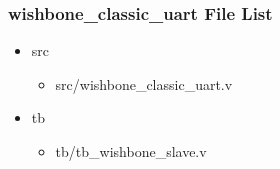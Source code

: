 \subsubsection{wishbone\_classic\_uart File List}
\begin{itemize}
\item src
	\begin{itemize}
	\item src/wishbone\_classic\_uart.v
	\end{itemize}
\item tb
	\begin{itemize}
	\item tb/tb\_wishbone\_slave.v
	\end{itemize}
\end{itemize}
